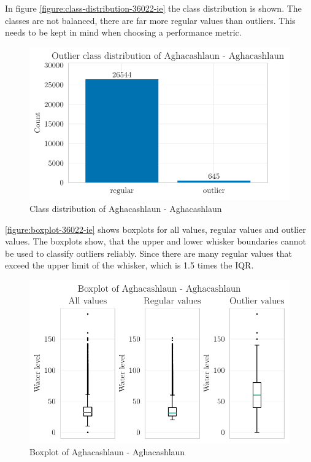 In figure \autoref{figure:class-distribution-36022-ie} the class distribution is shown. The classes are not balanced, there are far more regular values than outliers. This needs to be kept in mind when choosing a performance metric.
\begin{figure}[htp]
    \centering
    \includegraphics{./plots/pdfs/36022-ie/outlier_class_distribution_36022-ie.pdf}
    \caption{Class distribution of Aghacashlaun - Aghacashlaun}
    \label{figure:class-distribution-36022-ie}
\end{figure}

\autoref{figure:boxplot-36022-ie} shows boxplots for all values, regular values and outlier values. The boxplots show, that the upper and lower whisker boundaries cannot be used to classify outliers reliably. Since there are many regular values that exceed the upper limit of the whisker, which is 1.5 times the \ac{IQR}.
\begin{figure}[htp]
    \centering
    \includegraphics{./plots/pdfs/36022-ie/boxplot_36022-ie.pdf}
    \caption{Boxplot of Aghacashlaun - Aghacashlaun}
    \label{figure:boxplot-36022-ie}
\end{figure}


